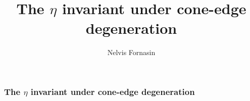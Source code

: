 \documentclass{beamer}
\title{The $\eta$ invariant under cone-edge degeneration} %
\author{Nelvis Fornasin} %
\institute[ALU] %
{
Albert-Ludwig-Universit\"at Freiburg  \\ %
\medskip
}
\date{\quad} %
\begin{document}
\begin{frame}
\titlepage %
\end{frame}

\begin{frame}
\frametitle{The $\eta$ invariant under cone-edge degeneration} %
\tableofcontents %
\end{frame}




\end{document}
